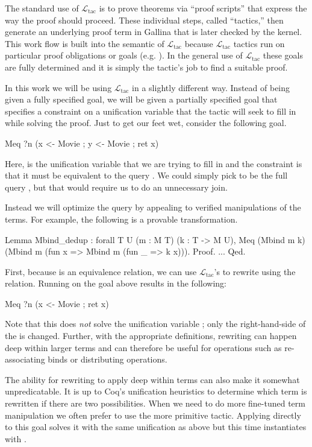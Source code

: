 \documentclass[preprint]{sigplanconf}
\newcommand{\ltac}[0]{\ensuremath{\mathcal{L}_{\mathrm{tac}}}}
\begin{document}
The standard use of \ltac{} is to prove theorems via ``proof scripts'' that express the way the proof should proceed.
These individual steps, called ``tactics,'' then generate an underlying proof term in Gallina that is later checked by the kernel.
This work flow is built into the semantic of \ltac{} because \ltac{} tactics run on particular proof obligations or goals (e.g. ).
In the general use of \ltac{} these goals are fully determined and it is simply the tactic's job to find a suitable proof.

In this work we will be using \ltac{} in a slightly different way.
Instead of being given a fully specified goal, we will be given a partially specified goal that specifies a constraint on a unification variable that the tactic will seek to fill in while solving the proof.
Just to get our feet wet, consider the following goal.
\begin{coq}
Meq ?n (x <- Movie ; y <- Movie ; ret x)
\end{coq}
Here,  is the unification variable that we are trying to fill in and the constraint is that it must be equivalent to the query .
We could simply pick  to be the full query , but that would require us to do an unnecessary join.

Instead we will optimize the query by appealing to verified manipulations of the terms.
For example, the following is a provable transformation.
\begin{coq}
Lemma Mbind_dedup : forall {T U} (m : M T) (k : T -> M U),
  Meq (Mbind m k) (Mbind m (fun x => Mbind m (fun _ => k x))).
Proof. ... Qed.
\end{coq}
First, because  is an equivalence relation, we can use \ltac's  to rewrite using the relation.
Running  on the goal above results in the following:
\begin{coq}
Meq ?n (x <- Movie ; ret x)
\end{coq}
Note that this does \emph{not} solve the unification variable ; only the right-hand-side of the  is changed.
Further, with the appropriate definitions, rewriting can happen deep within larger terms and can therefore be useful for operations such as re-associating binds or distributing operations.

The ability for rewriting to apply deep within terms can also make it somewhat unpredicatable.
It is up to Coq's unification heuristics to determine which term is rewritten if there are two possibilities.
When we need to do more fine-tuned term manipulation we often prefer to use the more primitive  tactic.
Applying  directly to this goal solves it with the same unification as above but this time instantiates  with .
\end{document}
